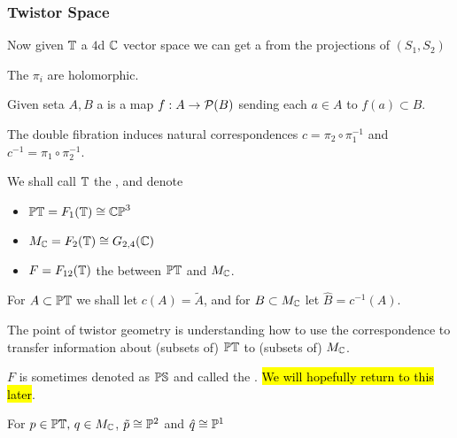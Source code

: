 \documentclass{article}
\begin{document}
\subsubsection{Twistor Space}
Now given $\mathbb{T}$ a $4$d $\mathbb{C}$ vector space we can get a 
from the projections of $(S_1,S_2)$ 
\begin{prop}
	The $\pi_i$ are holomorphic.
\end{prop}

\begin{definition}
	Given seta $A,B$ a   is a map $f: A \to \mathcal{P}(B)$ sending each $a \in A$ to $f(a) \subset B$.
\end{definition}
The double fibration induces natural correspondences $c=\pi_2 \circ \pi_1^{-1}$ and $c^{-1} = \pi_1 \circ \pi_2^{-1}$. 
\begin{notation}
	We shall call $\mathbb{T}$ the , and denote 
	\begin{itemize}
		\item $\mathbb{PT}=F_1(\mathbb{T}) \cong \mathbb{CP}^3$ 
		\item $M_{\mathbb{C}} = F_2(\mathbb{T}) \cong G_{2,4}(\mathbb{C})$ 
		\item $F = F_{12}(\mathbb{T})$ the  between $\mathbb{PT}$ and $M_{\mathbb{C}}$. 
	\end{itemize}
For $A \subset \mathbb{PT}$ we shall let $c(A) = \tilde{A}$, and for $B \subset M_{\mathbb{C}}$ let $\hat{B} = c^{-1}(A)$. 
\end{notation}

\begin{idea}
	The point of twistor geometry is understanding how to use the correspondence
	to transfer information about (subsets of) $\mathbb{PT}$ to (subsets of) $M_{\mathbb{C}}$. 
\end{idea}

\begin{remark}
	$F$ is sometimes denoted as $\mathbb{PS}$ and called the . \hl{We will hopefully return to this later}. 
\end{remark}

\begin{prop}
	For $p \in \mathbb{PT}, \, q \in M_{\mathbb{C}}$, $\tilde{p} \cong \mathbb{P}^2$ and $\hat{q} \cong \mathbb{P}^1$
\end{prop}
\end{document}
